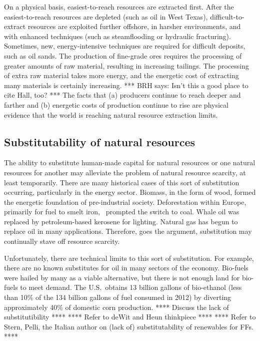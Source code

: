 On a physical basis, 
easiest-to-reach resources are extracted first. 
After the easiest-to-reach resources are depleted (such as oil in West Texas),
difficult-to-extract resources are exploited
further offshore,
in harsher environments, and
with enhanced techniques (such as steamflooding or hydraulic fracturing).
Sometimes, new, energy-intensive techniques are required 
for difficult deposits, such as oil sands.
The production of fine-grade ores
requires the processing of greater amounts of raw material, 
resulting in increasing tailings.
The processing of extra raw material takes more energy, and 
the energetic cost of extracting many materials is certainly increasing.\cite{Mudd2010,Hall2011}
*** BRH says: Isn't this a good place to cite Hall, too? ***
The facts that (a) producers continue to reach deeper and farther 
and (b) energetic costs of production continue to rise
are physical evidence that the world is reaching natural resource extraction limits.


\subsection{Substitutability of natural resources}

The ability to substitute human-made capital for natural resources
or one natural resources for another 
may alleviate the problem of natural resource scarcity,
at least temporarily.
There are many historical cases of this sort of substitution occurring,
particularly in the energy sector.
Biomass, in the form of wood,
formed the energetic foundation of pre-industrial society.
Deforestation within Europe,
primarily for fuel to smelt iron,~\cite{Smil1994}
prompted the switch to coal.
Whale oil was replaced by petroleum-based kerosene for lighting.\cite{Weissenbacher2009}
Natural gas has begun to replace oil in many applications.
Therefore, goes the argument, 
substitution may continually stave off resource scarcity.

Unfortunately, there are technical limits to this sort of substitution.
For example, there are no known substitutes for oil 
in many sectors of the economy.\cite{Hirsch2005}
Bio-fuels were hailed by many as a viable alternative,
but there is not enough land for bio-fuels to meet demand.
The U.S.\ obtains 13 billion gallons of bio-ethanol 
(less than 10\% of the 134 billion gallons of fuel consumed in 2012)
by diverting approximately 40\%
of domestic corn production.\cite{EIA2014, USDA2014}
**** Discuss the lack of substitutibility **** 
**** Refer to deWit and Heun thinkpiece ****
**** Refer to Stern, Pelli, the Italian author on (lack of) 
substitutability of renewables for FFs. ****


